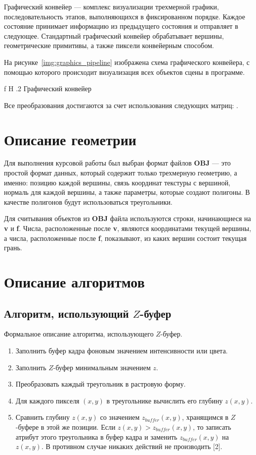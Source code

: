 Графический конвейер --- комплекс визуализации трехмерной графики, последовательность этапов, выполняющихся в фиксированном порядке. 
Каждое состояние принимает информацию из предыдущего состояния и отправляет в следующее. 
Стандартный графический конвейер обрабатывает вершины, геометрические примитивы, а также пиксели конвейерным способом.

На рисунке~\ref{img:graphics_pipeline} изображена схема графического конвейера, с помощью которого происходит визуализация всех объектов сцены в программе.

    {f}
    {H}
    {.2\textwidth}
    {Графический конвейер}
    
Все преобразования достигаются за счет использования следующих матриц: .
    
\section{Описание геометрии}

Для выполнения курсовой работы был выбран формат файлов \textbf{OBJ} --- это простой формат данных, который содержит только трехмерную геометрию, а именно: позицию каждой вершины, связь координат текстуры с вершиной, нормаль для каждой вершины, а также параметры, которые создают полигоны. 
В качестве полигонов будут использоваться треугольники.

Для считывания объектов из \textbf{OBJ} файла используются строки, начинающиеся на \textbf{v} и \textbf{f}. 
Числа, расположенные после \textbf{v}, являются координатами текущей вершины, а числа, расположенные после \textbf{f}, показывают, из каких вершин состоит текущая грань.

\section{Описание алгоритмов}

\subsection{Алгоритм, использующий $Z$-буфер}

Формальное описание алгоритма, использующего $Z$-буфер.

\begin{enumerate}
\item
Заполнить буфер кадра фоновым значением интенсивности или цвета.
\item
Заполнить $Z$-буфер минимальным значением $z$.
\item
Преобразовать каждый треугольник в растровую форму.
\item
Для каждого пикселя $(x, y)$ в треугольнике вычислить его глубину $z(x, y)$.
\item
Сравнить глубину $z(x, y)$ со значением $z_{buffer}(x, y)$, хранящимся в $Z$-буфере в этой же позиции. 
Если $z(x, y) > z_{buffer}(x, y)$, то записать атрибут этого треугольника в буфер кадра и заменить $z_{buffer}(x, y)$ на $z(x, y)$. 
В противном случае никаких действий не производить [2].
\end{enumerate}

